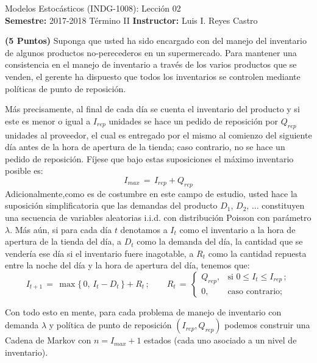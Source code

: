\documentclass[ a4paper, twoside, 11pt]{article}
\newcommand{\numero}{02}
\begin{document}
\allowdisplaybreaks



\begin{center}
\Large Modelos Estoc\'asticos (INDG-1008): Lecci\'on \numero \\[2ex]
\small \textbf{Semestre:} 2017-2018 T\'ermino II \qquad
\textbf{Instructor:} Luis I. Reyes Castro
\end{center}
\fullskip

\begin{problem}
\textbf{(5 Puntos)}
Suponga que usted ha sido encargado con del manejo del inventario de algunos productos no-perecederos en un supermercado. Para mantener una consistencia en el manejo de inventario a trav\'es de los varios productos que se venden, el gerente ha dispuesto que todos los inventarios se controlen mediante pol\'iticas de punto de reposici\'on. 

M\'as precisamente, al final de cada d\'ia se cuenta el inventario del producto y si este es menor o igual a $I_{rep}$ unidades se hace un pedido de reposici\'on por $Q_{rep}$ unidades al proveedor, el cual es entregado por el mismo al comienzo del siguiente d\'ia antes de la hora de apertura de la tienda; caso contrario, no se hace un pedido de reposici\'on. F\'ijese que bajo estas suposiciones el m\'aximo inventario posible es:
\[
I_{max} \, = \, I_{rep} + Q_{rep}
\]
Adicionalmente,como es de costumbre en este campo de estudio, usted hace la suposici\'on simplificatoria que las demandas del producto $D_1, \, D_2, \, \dots$ constituyen una secuencia de variables aleatorias i.i.d. con distribuci\'on Poisson con par\'ametro $\lambda$. M\'as a\'un, si para cada d\'ia $t$ denotamos a $I_t$ como el inventario a la hora de apertura de la tienda del \tavo d\'ia, a $D_t$ como la demanda del d\'ia, \ie la cantidad que se vender\'ia ese d\'ia si el inventario fuere inagotable, a $R_t$ como la cantidad repuesta entre la noche del \tavo d\'ia y la hora de apertura del \tMavo d\'ia, tenemos que:
\[
I_{t+1} \, = \, \max \{ \, 0, \, I_t - D_t \, \} + R_t \, ; \qquad
R_t \, = \, 
\begin{cases}
Q_{rep}, & \text{si } 0 \leq I_t \leq I_{rep} \, ; \\
0, & \text{caso contrario;}
\end{cases}
\]

Con todo esto en mente, para cada problema de manejo de inventario con demanda $\lambda$ y pol\'itica de punto de reposici\'on $(I_{rep},Q_{rep})$ podemos construir una Cadena de Markov con \linebreak $n = I_{max} + 1$ estados (cada uno asociado a un nivel de inventario). 


\end{problem}
\end{document}

